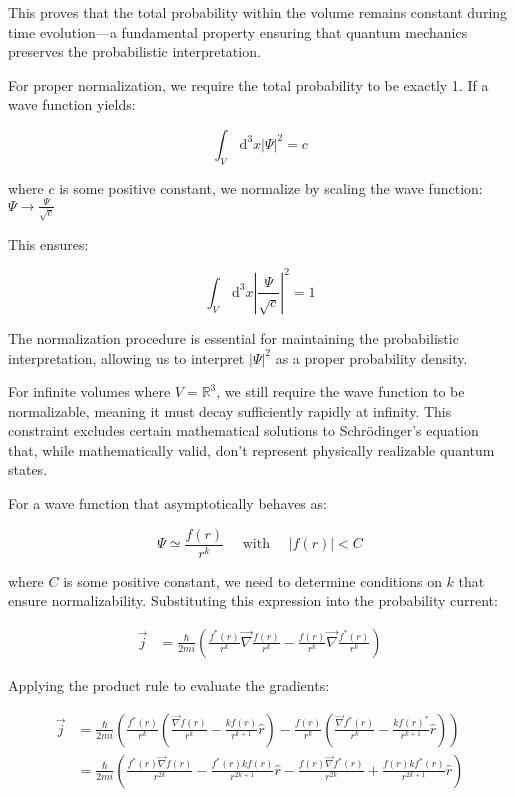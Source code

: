 \documentclass[italian]{HKNdocument}
\begin{document}
This proves that the total probability within the volume remains constant during time evolution—a fundamental property ensuring that quantum mechanics preserves the probabilistic interpretation.

For proper normalization, we require the total probability to be exactly 1. If a wave function yields:

\begin{equation}
\int_{V} \, \mathrm{d}^{3} x|\Psi|^{2}=c
\end{equation}

where $c$ is some positive constant, we normalize by scaling the wave function:
$\Psi \rightarrow \frac{\Psi}{\sqrt{c}}$

This ensures:

\begin{equation}
\int_{V} \, \mathrm{d}^{3} x\left|\frac{\Psi}{\sqrt{c}}\right|^{2}=1
\end{equation}

The normalization procedure is essential for maintaining the probabilistic interpretation, allowing us to interpret $|\Psi|^2$ as a proper probability density.

For infinite volumes where $V=\mathbb{R}^{3}$, we still require the wave function to be normalizable, meaning it must decay sufficiently rapidly at infinity. This constraint excludes certain mathematical solutions to Schrödinger's equation that, while mathematically valid, don't represent physically realizable quantum states.


For a wave function that asymptotically behaves as:

\begin{equation}
\Psi \simeq \frac{f(r)}{r^{k}} \quad \text { with } \quad|f(r)|<C
\end{equation}

where $C$ is some positive constant, we need to determine conditions on $k$ that ensure normalizability. Substituting this expression into the probability current:

\begin{align}
\vec{j} &= \frac{\hbar}{2 m i}\left(\frac{f^{*}(r)}{r^{k}} \vec{\nabla} \frac{f(r)}{r^{k}}-\frac{f(r)}{r^{k}} \vec{\nabla} \frac{f^{*}(r)}{r^{k}}\right)
\end{align}

Applying the product rule to evaluate the gradients:

\begin{align}
\vec{j} &= \frac{\hbar}{2 m i}\left(\frac{f^{*}(r)}{r^{k}}\left(\frac{\vec{\nabla} f(r)}{r^{k}}-\frac{k f(r)}{r^{k+1}}\hat{r}\right)-\frac{f(r)}{r^{k}}\left(\frac{\vec{\nabla} f^{*}(r)}{r^{k}}-\frac{k f(r)^{*}}{r^{k+1}}\hat{r}\right)\right) \\
&= \frac{\hbar}{2 m i}\left(\frac{f^{*}(r) \vec{\nabla} f(r)}{r^{2 k}}-\frac{f^{*}(r) k f(r)}{r^{2 k+1}}\hat{r}-\frac{f(r) \vec{\nabla} f^{*}(r)}{r^{2 k}}+\frac{f(r) k f^{*}(r)}{r^{2 k+1}}\hat{r}\right)
\end{align}
\end{document}
